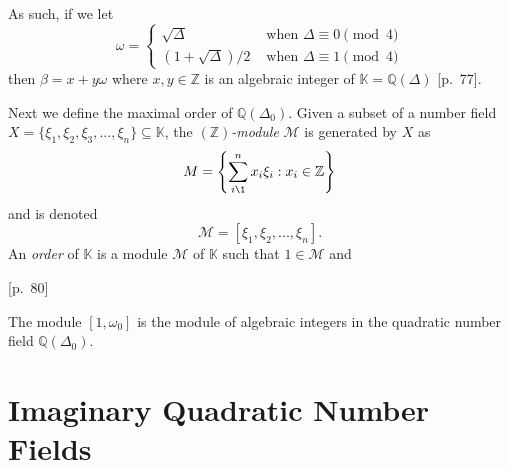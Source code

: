 \documentclass[11pt, letterpaper]{book}
\theoremstyle{definition}
\newcommand{\KK}{\mathbb{K}}
\newcommand{\MM}{\mathcal{M}}
\newcommand{\ZZ}{\mathbb{Z}}
\newcommand{\QQ}{\mathbb{Q}}
\begin{document}
As such, if we let 
\[
	\omega = \begin{cases}
		\sqrt{\Delta} & \textrm{ when } \Delta \equiv 0 \pmod 4 \\
		(1+\sqrt{\Delta})/2 & \textrm{ when } \Delta \equiv 1 \pmod 4
	\end{cases}
\]
then $\beta = x + y \omega$ where $x,y \in \ZZ$ is an algebraic integer of $\KK = \QQ(\Delta)$ \cite{JacobsonCh4}[p.~77].

\bigbreak
Next we define the maximal order of $\QQ(\Delta_0)$.  Given a subset of a number field $X = \{ \xi_1, \xi_2, \xi_3, ..., \xi_n \} \subseteq \KK$, the \emph{$(\ZZ)$-module} $\MM$ is generated by $X$ as
\[
	M = \left \{ \sum_{i\1}^n x_i \xi_i : x_i \in \ZZ \right \}
\]
and is denoted
\[
	\MM = [ \xi_1, \xi_2, ..., \xi_n ].
\]
An \emph{order} of $\KK$ is a module $\MM$ of $\KK$ such that $1 \in \MM$ and 

\cite{JacobsonCh4}[p.~80]

The module $[1, \omega_0]$ is the module of algebraic integers in the quadratic number field $\QQ(\Delta_0)$.


\section{Imaginary Quadratic Number Fields}
\end{document}
